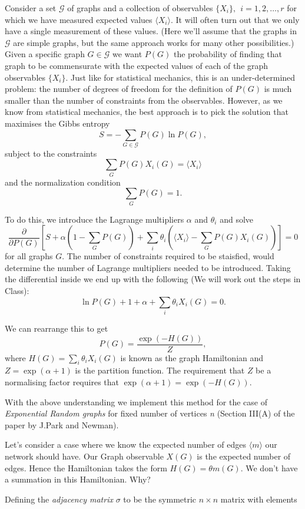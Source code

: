Consider a set $\mathcal{G}$ of graphs and a collection of observables $\{X_i\},~~i=1,2,\ldots,r$ for which we have measured expected values $\langle X_i\rangle$. It will often turn out that we only have a single measurement of these values. (Here we'll assume that the graphs in $\mathcal{G}$ are simple graphs, but the same approach works for many other possibilities.) Given a specific graph $G\in\mathcal{G}$ we want $P(G)$ the probability of finding that graph to be commensurate with the expected values of each of the graph observables $\{X_i\}$. Just like for statistical  mechanics, this is an under-determined problem: the number of degrees of freedom for the definition of $P(G)$ is much smaller than the number of constraints from the observables. However, as we know from statistical mechanics, the best approach is to pick the solution that maximises the Gibbs entropy
$$
	S= -\sum_{G\in\mathcal{G}}P(G)\ln P(G),
$$
subject to the constraints
$$
	\sum_G P(G)X_i(G) = \langle X_i\rangle
$$
and the normalization condition
$$
	\sum_G P(G) =1.
$$

To do this, we introduce the Lagrange multipliers $\alpha$ and $\theta_i$ and solve
$$
	\frac{\partial}{\partial P(G)}\left[S + \alpha \left(1-\sum_G P(G)\right) + \sum_i \theta_i \left(\langle X_i \rangle - \sum_G P(G)X_i(G)\right) \right] = 0
$$
for all graphs $G$. The number of constraints required to be staisfied, would determine the number of Lagrange multipliers needed to be introduced. 
Taking the differential inside we end up with the following (We will work out the steps in Class):
$$
	\ln P(G) +1 +\alpha +\sum_i\theta_iX_i(G) = 0.
$$

We can rearrange this to get
$$
	P(G) = \frac{\exp(-H(G))}{Z},
$$
where $H(G) = \sum_i\theta_iX_i(G)$ is known as the graph Hamiltonian and $Z = \exp(\alpha+1)$ is the partition function. The requirement that $Z$ be a normalising factor requires that $\exp(\alpha+1) = \exp(-H(G))$.

With the above understanding we implement this method for the case of \emph{Exponential Random graphs} for fixed number of vertices \emph{n} (Section III(A) of the paper by J.Park and Newman). 

Let's consider a case where we know the expected number of edges $\langle m \rangle$ our network should have. Our Graph observable $X(G)$ is the expected number of edges. Hence the Hamiltonian takes the form $H(G) = \theta m(G) $. We don't have a summation in this Hamiltonian. Why? 

Defining the \emph{adjacency matrix} $\sigma$ to be the symmetric $n \times n$ matrix with elements

